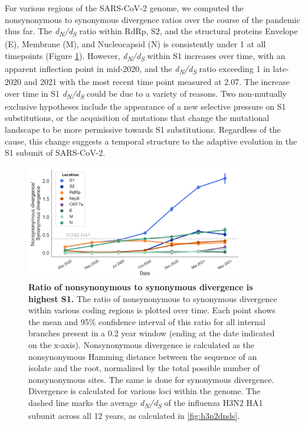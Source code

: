 \documentclass[11pt,oneside,letterpaper]{article}
\begin{document}
For various regions of the SARS-CoV-2 genome, we computed the nonsynonymous to synonymous divergence ratios over the course of the pandemic thus far.
The \emph{d\textsubscript{N}/d\textsubscript{S}} ratio within RdRp, S2, and the structural proteins Envelope (E), Membrane (M), and Nucleocapsid (N) is consistently under 1 at all timepoints (Figure \ref{fig:dnds}).
However, \emph{d\textsubscript{N}/d\textsubscript{S}} within S1 increases over time, with an apparent inflection point in mid-2020, and the \emph{d\textsubscript{N}/d\textsubscript{S}} ratio exceeding 1 in late-2020 and 2021 with the most recent time point measured at 2.07.
The increase over time in S1 \emph{d\textsubscript{N}/d\textsubscript{S}} could be due to a variety of reasons.
Two non-mutually exclusive hypotheses include the appearance of a new selective pressure on S1 substitutions, or the acquisition of mutations that change the mutational landscape to be more permissive towards S1 substitutions.
Regardless of the cause, this change suggests a temporal structure to the adaptive evolution in the S1 subunit of SARS-CoV-2.

\begin{figure}[h!]
	\centerline{\includegraphics[width=0.85\textwidth]{fig2_dnds.png}}
	\caption{\textbf{Ratio of nonsynonymous to synonymous divergence is highest S1.}
	The ratio of nonsynonymous to synonymous divergence within various coding regions is plotted over time.
	Each point shows the mean and 95\% confidence interval of this ratio for all internal branches present in a 0.2 year window (ending at the date indicated on the x-axis).
	Nonsynonymous divergence is calculated as the nonsynonymous Hamming distance between the sequence of an isolate and the root, normalized by the total possible number of nonsynonymous sites.
	The same is done for synonymous divergence.
	Divergence is calculated for various loci within the genome.
	The dashed line marks the average \emph{d\textsubscript{N}/d\textsubscript{S}} of the influenza H3N2 HA1 subunit across all 12 years, as calculated in \ref{fig:h3n2dnds}.
	}
	\label{fig:dnds}
\end{figure}
\end{document}
